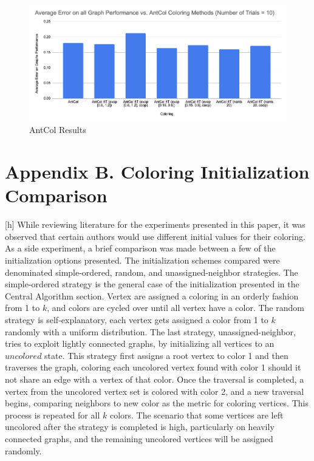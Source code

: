 \documentclass[runningheads]{llncs}
\begin{document}
\begin{figure}[!h]
  \centering
  \includegraphics[width=1\textwidth]{AntCol.png}
  \caption{AntCol Results}
  \label{fig:antcol}
\end{figure}

\clearpage
\section{Appendix B. Coloring Initialization Comparison}[h]
While reviewing literature for the experiments presented in this paper, it was observed that certain authors would use different initial values for their coloring. As a side experiment, a brief comparison was made between a few of the initialization options presented. The initialization schemes compared were denominated simple-ordered, random, and unassigned-neighbor strategies.
The simple-ordered strategy is the general case of the initialization presented in the Central Algorithm section. Vertex are assigned a coloring in an orderly fashion from 1 to $k$, and colors are cycled over until all vertex have a color. The random strategy is self-explanatory, each vertex gets assigned a color from 1 to $k$ randomly with a uniform distribution. The last strategy, unassigned-neighbor, tries to exploit lightly connected graphs, by initializing all vertices to an $uncolored$ state.
This strategy first assigns a root vertex to color 1 and then traverses the graph, coloring each uncolored vertex found with color 1 should it not share an edge with a vertex of that color. Once the traversal is completed, a vertex from the uncolored vertex set is colored with color 2, and a new traversal begins, comparing neighbors to new color as the metric for coloring vertices. This process is repeated for all $k$ colors. The scenario that some vertices are left uncolored after the strategy is completed is high, particularly on heavily connected graphs, and the remaining uncolored vertices will be assigned randomly.\\
\end{document}
